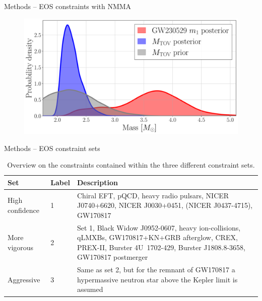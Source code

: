 \documentclass[usenames,dvipsnames,t]{beamer}
\begin{document}
\begin{frame}{Methods -- EOS constraints with \textsc{NMMA}}
\vspace{\x}
\begin{figure}
  \centering
  \includegraphics[width=0.7\linewidth]{Figures/mtov_gw230529_set_L1.pdf}
\end{figure}
\end{frame}


\begin{frame}{Methods -- EOS constraint sets}

  \small
\begin{table}[t]
  \renewcommand{\arraystretch}{1.1}
  \caption{Overview on the constraints contained within the three different constraint sets.}
  \label{tab:sets}
  \begin{tabular}{ l l p{7cm}}
  \toprule
  \toprule
  Set & Label & Description \\
  \midrule
  High confidence & 1 & Chiral EFT, pQCD, heavy radio pulsars, NICER \mbox{J0740+6620}, NICER \mbox{J0030+0451}, (NICER \mbox{J0437-4715}), GW170817\\
  \midrule
  More vigorous & 2 & Set 1, Black Widow \mbox{J0952-0607}, heavy ion-collisions, qLMXBs, GW170817+KN+GRB afterglow, CREX, PREX-II, Burster \mbox{4U 1702-429}, Burster \mbox{J1808.8-3658}, GW170817 postmerger\\
  \midrule
  Aggressive & 3 & Same as set 2, but for the remnant of GW170817 a hypermassive neutron star above the Kepler limit is assumed \\
  \bottomrule
  \end{tabular}
\end{table} 
\normalsize

\end{frame}
\end{document}
